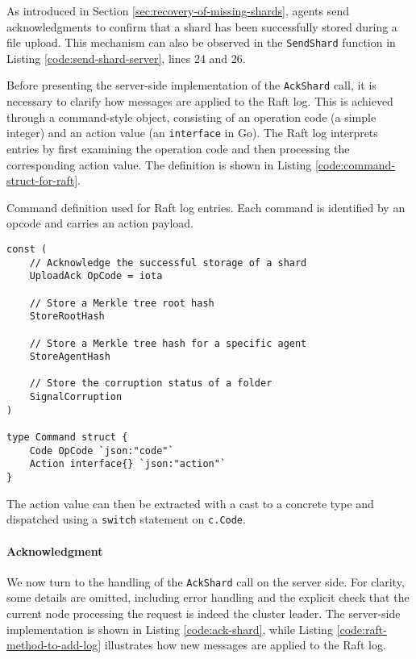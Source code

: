 As introduced in Section \ref{sec:recovery-of-missing-shards}, agents send acknowledgments to confirm that a shard has been successfully stored during a file upload. This mechanism can also be observed in the \texttt{SendShard} function in Listing \ref{code:send-shard-server}, lines 24 and 26.

Before presenting the server-side implementation of the \texttt{AckShard} call, it is necessary to clarify how messages are applied to the Raft log. This is achieved through a command-style object, consisting of an operation code (a simple integer) and an action value (an \texttt{interface{}} in Go). The Raft log interprets entries by first examining the operation code and then processing the corresponding action value. The definition is shown in Listing \ref{code:command-struct-for-raft}.

\begin{listing}
\caption{Command definition used for Raft log entries. Each command is identified by an opcode and carries an action payload.}
\label{code:command-struct-for-raft}
\begin{verbatim}
const (
    // Acknowledge the successful storage of a shard
    UploadAck OpCode = iota
    
    // Store a Merkle tree root hash
    StoreRootHash
    
    // Store a Merkle tree hash for a specific agent
    StoreAgentHash
    
    // Store the corruption status of a folder
    SignalCorruption
)

type Command struct {
    Code OpCode `json:"code"`
    Action interface{} `json:"action"`
}
\end{verbatim}
\end{listing}

The action value can then be extracted with a cast to a concrete type and dispatched using a \texttt{switch} statement on \texttt{c.Code}.

\paragraph{Acknowledgment}

We now turn to the handling of the \texttt{AckShard} call on the server side. For clarity, some details are omitted, including error handling and the explicit check that the current node processing the request is indeed the cluster leader. The server-side implementation is shown in Listing \ref{code:ack-shard}, while Listing \ref{code:raft-method-to-add-log} illustrates how new messages are applied to the Raft log.

